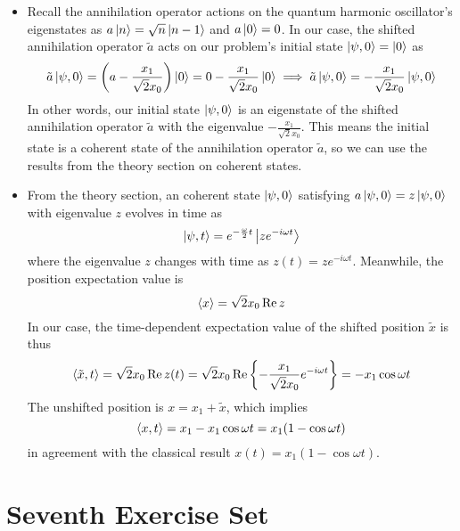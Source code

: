 \documentclass[11pt, a4paper]{article}
\begin{document}
\begin{itemize}
 	\item Recall the annihilation operator actions on the quantum harmonic oscillator's eigenstates as $ a \ket{n} = \sqrt{n} \ket{n-1} $ and $ a \ket{0} = 0 $. In our case, the shifted annihilation operator $ \tilde{a} $ acts on our problem's initial state $ \ket{\psi, 0} = \ket{0} $ as
 	\begin{equation*}
 		\tilde{a}\ket{\psi, 0} = \left(a -\frac{x_{1}}{\sqrt{2}x_{0}}\right)\ket{0} = 0 - \frac{x_{1}}{\sqrt{2}x_{0}} \ket{0} \implies \tilde{a}\ket{\psi, 0} = - \frac{x_{1}}{\sqrt{2}x_{0}} \ket{\psi, 0}
 	\end{equation*}
 	In other words, our initial state $ \ket{\psi, 0} $ is an eigenstate of the shifted annihilation operator $ \tilde{a} $ with the eigenvalue $  - \frac{x_{1}}{\sqrt{2}x_{0}} $. This means the initial state is a coherent state of the annihilation operator $ \tilde{a} $, so we can use the results from the theory section on coherent states.
 	
 	\item From the theory section, an coherent state $ \ket{\psi, 0} $ satisfying $ a \ket{\psi, 0} = z \ket{\psi, 0} $ with eigenvalue $ z $ evolves in time as
 	\begin{equation*}
		\ket{\psi, t} = e^{-\frac{\omega}{2}t}\ket{ze^{-i\omega t}}
 	\end{equation*}
	where the eigenvalue $ z $ changes with time as $ 	z(t) = ze^{-i\omega t} $. Meanwhile, the position expectation value is
	\begin{equation*}
		\ev{x} = \sqrt{2} x_{0}\Re z
	\end{equation*}
	In our case, the time-dependent expectation value of the shifted position $ \tilde{x} $ is thus
	\begin{equation*}
		\ev{\tilde{x}, t} = \sqrt{2}x_{0}\Re z(t) = \sqrt{2}x_{0}\Re \left\{- \frac{x_{1}}{\sqrt{2}x_{0}}e^{-i\omega t}\right\} = - x_{1} \cos \omega t
	\end{equation*}
	The unshifted position is $ x = x_{1} + \tilde{x} $, which implies
	\begin{equation*}
		\ev{x, t} = x_{1} - x_{1}\cos \omega t = x_{1}(1 - \cos \omega t)
	\end{equation*}
	in agreement with the classical result $ x(t) = x_{1}(1 - \cos \omega t) $. 
\end{itemize}


\section{Seventh Exercise Set}
\end{document}
